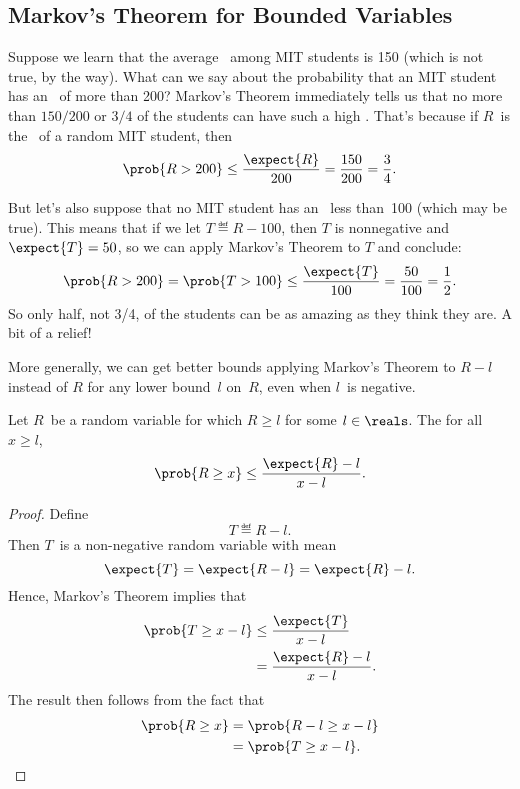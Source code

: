 \subsection{Markov's Theorem for Bounded Variables}

Suppose we learn that the average \IQ\ among MIT students is 150
(which is not true, by the way).  What can we say about the
probability that an MIT student has an \IQ\ of more than 200?
Markov's Theorem immediately tells us that no more than $150/200$ or
$3/4$ of the students can have such a high \IQ.  That's because if
$R$~is the \IQ\ of a random MIT student, then
\[
    \prob{R > 200} \leq \frac{\expect{R}}{200}= \frac{150}{200} = \frac{3}{4}.
\]

But let's also suppose that no MIT student has an \IQ\ less than~100
(which may be true).  This means that if we let $T \eqdef R-100$, then
$T$ is nonnegative and $\expect{T} = 50$, so we can apply Markov's
Theorem to $T$ and conclude:
\[
\prob{R > 200} = \prob{T > 100} \leq \frac{\expect{T}}{100}= \frac{50}{100} =
\frac{1}{2}.
\]
So only half, not 3/4, of the students can be as amazing as they think
they are.  A bit of a relief!

More generally, we can get better bounds applying Markov's Theorem to
$R-l$ instead of $R$ for any lower bound~$l$ on~$R$, even when $l$~is
negative.

\begin{theorem}\label{thm:18C1}
Let $R$~be a random variable for which $R \ge l$ for some $l \in
\reals$.  The for all~$x \ge l$,
\begin{equation*}
    \prob{R \ge x} \le \frac{\expect{R} - l}{x - l}.
\end{equation*}
\end{theorem}

\begin{proof}
Define
\begin{equation*}
    T \eqdef R - l.
\end{equation*}
Then $T$~is a non-negative random variable with mean
\begin{equation*}
\expect{T} = \expect{R - l} = \expect{R} - l.
\end{equation*}
Hence, Markov's Theorem implies that
\begin{align*}
\prob{T \ge x - l}
    &\le \frac{\expect{T}}{x - l} \\
    &=   \frac{\expect{R} - l}{x - l}.
\end{align*}
The result then follows from the fact that
\begin{align*}
\prob{R \ge x}
    &= \prob{R - l \ge x - l} \\
    &= \prob{T \ge x - l}. \qedhere
\end{align*}
\end{proof}

